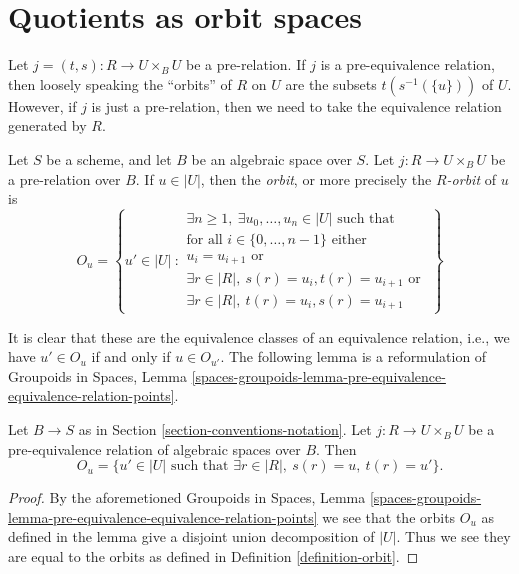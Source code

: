 \section{Quotients as orbit spaces}
\label{section-orbits}

\noindent
Let $j = (t, s) : R \to U \times_B U$ be a pre-relation.
If $j$ is a pre-equivalence relation, then loosely speaking
the ``orbits'' of $R$ on $U$
are the subsets $t(s^{-1}(\{u\}))$ of $U$. However, if $j$ is just a
pre-relation, then we need to take the equivalence relation generated
by $R$.

\begin{definition}
\label{definition-orbit}
Let $S$ be a scheme, and let $B$ be an algebraic space over $S$.
Let $j : R \to U \times_B U$ be a pre-relation over $B$.
If $u \in |U|$, then the {\it orbit}, or more precisely the
{\it $R$-orbit} of $u$ is
$$
O_u =
\left\{
u' \in |U|\ :
\begin{matrix}
\exists n \geq 1, \ \exists u_0, \ldots, u_n \in |U|\text{ such that} \\
\text{for all }i \in \{0, \ldots, n - 1\}\text{ either } \\
u_i = u_{i + 1}\text{ or } \\
\exists r \in |R|, \ s(r) = u_i, t(r) = u_{i + 1}
\text{ or } \\
\exists r \in |R|, \ t(r) = u_i, s(r) = u_{i + 1}
\end{matrix}
\right\}
$$
\end{definition}

\noindent
It is clear that these are the equivalence classes of an equivalence relation,
i.e., we have $u' \in O_u$ if and only if $u \in O_{u'}$. The following lemma
is a reformulation of
Groupoids in Spaces,
Lemma \ref{spaces-groupoids-lemma-pre-equivalence-equivalence-relation-points}.

\begin{lemma}
\label{lemma-pre-equivalence-equivalence-relation-points}
Let $B \to S$ as in Section \ref{section-conventions-notation}.
Let $j : R \to U \times_B U$ be a pre-equivalence relation
of algebraic spaces over $B$. Then
$$
O_u =
\{u' \in |U| \text{ such that } \exists r \in |R|, \ s(r) = u, \ t(r) = u'\}.
$$
\end{lemma}

\begin{proof}
By the aforemetioned
Groupoids in Spaces,
Lemma \ref{spaces-groupoids-lemma-pre-equivalence-equivalence-relation-points}
we see that the orbits $O_u$ as defined in the lemma give a disjoint
union decomposition of $|U|$. Thus we see they are equal to the
orbits as defined in Definition \ref{definition-orbit}.
\end{proof}


